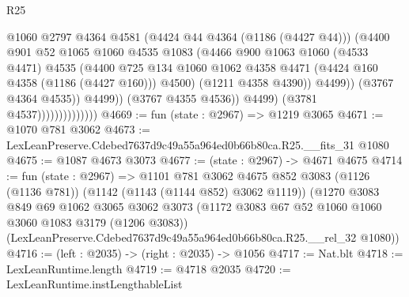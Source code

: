 \begin{lexlean}{R25}
\begin{coremodule}
                                          @1060
                                          @2797
                                          @4364
                                          @4581
                                          (@4424 @44 @4364 (@1186 (@4427 @44)))
                                          (@4400
                                            @901
                                            @52
                                            @1065
                                            @1060
                                            @4535
                                            @1083
                                            (@4466
                                              @900
                                              @1063
                                              @1060
                                              (@4533 @4471)
                                              @4535
                                              (@4400
                                                @725
                                                @134
                                                @1060
                                                @1062
                                                @4358
                                                @4471
                                                (@4424 @160 @4358 (@1186 (@4427 @160)))
                                                @4500)
                                              (@1211 @4358 @4390))
                                            @4499))
                                        (@3767 @4364 @4535))
                                      @4499))
                                  (@3767 @4355 @4536))
                                @4499)
                              (@3781 @4537))))))))))))))
@4669 := fun (state : @2967) => @1219 @3065
@4671 := @1070 @781 @3062
@4673 := LexLeanPreserve.Cdebed7637d9c49a55a964ed0b66b80ca.R25.__fits_31 @1080
@4675 := @1087 @4673 @3073
@4677 := (state : @2967) -> @4671 @4675
@4714 := fun (state : @2967) =>
  @1101
    @781
    @3062
    @4675
    @852
    @3083
    (@1126 (@1136 @781))
    (@1142 (@1143 (@1144 @852) @3062 @1119))
    (@1270
      @3083
      @849
      @69
      @1062
      @3065
      @3062
      @3073
      (@1172 @3083 @67 @52 @1060 @1060 @3060 @1083 @3179 (@1206 @3083))
      (LexLeanPreserve.Cdebed7637d9c49a55a964ed0b66b80ca.R25.__rel_32 @1080))
@4716 := (left : @2035) -> (right : @2035) -> @1056
@4717 := Nat.blt
@4718 := LexLeanRuntime.length
@4719 := @4718 @2035
@4720 := LexLeanRuntime.instLengthableList

\end{coremodule}
\end{lexlean}
